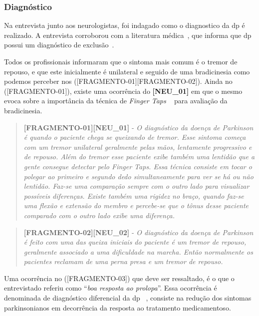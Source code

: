 \subsubsection{Diagnóstico}\label{section:analise_diagnostico}

Na entrevista junto aos neurologistas, foi indagado como o diagnostico da \ac{dp} é realizado.  A entrevista corroborou com a literatura médica~\cite{tolosa06,vedolin2003}, que informa que \ac{dp} possui um diagnóstico de exclusão~\cite{national2006parkinson,protpar010}.  

Todos os profissionais informaram que o sintoma mais comum é o tremor de repouso, e que este inicialmente é unilateral e seguido de uma bradicinesia como podemos perceber nos ([FRAGMENTO-01][FRAGMENTO-02]). Ainda no ([FRAGMENTO-01]), existe uma ocorrência do \textbf{[NEU\_01]} em que o mesmo evoca sobre a importância da técnica de \textit{Finger Taps} ~\cite{updrs87} para avaliação da bradicinesia.


\begin{quote}
\textbf{[FRAGMENTO-01][NEU\_01]} - 
\emph{
O diagnóstico da doença de Parkinson é quando o paciente chega se queixando de tremor. Esse sintoma começa com um tremor unilateral geralmente pelas mãos, lentamente progressivo e de repouso. Além do tremor esse paciente exibe também uma lentidão que a gente consegue detectar pelo \textit{Finger Taps}. Essa técnica consiste em tocar o polegar ao primeiro e segundo dedo simultaneamente para ver se há ou não lentidão. Faz-se uma comparação sempre com o outro lado para visualizar possíveis diferenças. 
Existe também uma rigidez no braço, quando faz-se uma flexão e extensão do membro e percebe-se que o tônus desse paciente comparado com o outro lado exibe uma diferença.
}
\end{quote}

\begin{quote}
\textbf{[FRAGMENTO-02][NEU\_02]} -
\emph{
O diagnóstico da doença de Parkinson é feito com uma das queixa iniciais do paciente é um tremor de repouso, geralmente associado a uma dificuldade na marcha. Então normalmente os pacientes reclamam de uma perna presa e um tremor de repouso. 
}
\end{quote}

Uma ocorrência no ([FRAGMENTO-03]) que deve ser ressaltado, é o que o entrevistado referiu como ``\textit{boa resposta ao prolopa}''. Essa ocorrência é denominada de diagnóstico diferencial da \ac{dp} ~\cite{protpar010}, consiste na redução dos sintomas parkinsonianos em decorrência da resposta ao tratamento medicamentoso. 

